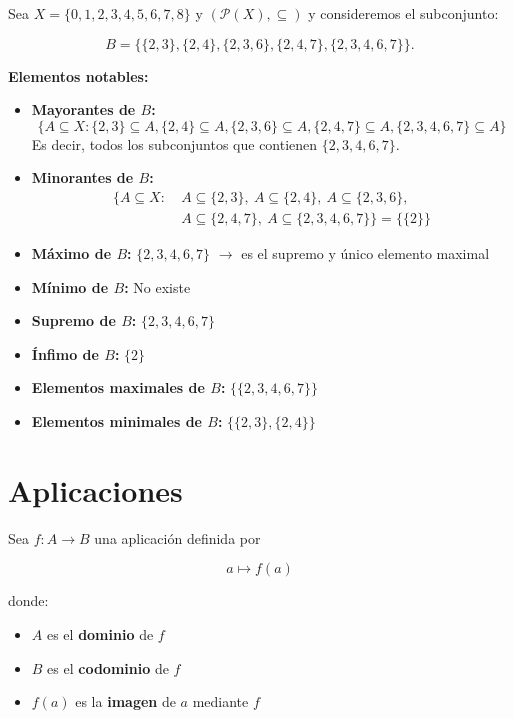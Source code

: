 \documentclass[a4paper,12pt]{article}
\begin{document}
\begin{ejemplo}[title=Ejemplo 3: Orden por Inclusión]
Sea \(X = \{0,1,2,3,4,5,6,7,8\}\) y \((\mathcal{P}(X), \subseteq)\) y consideremos el subconjunto:

\[
B = \{ \{2,3\}, \{2,4\}, \{2,3,6\}, \{2,4,7\}, \{2,3,4,6,7\} \}.
\]

\textbf{Elementos notables:}
\begin{itemize}
    \item \textbf{Mayorantes de \(B\):} 
    \[
    \{ A \subseteq X : \{2,3\} \subseteq A, \{2,4\} \subseteq A, \{2,3,6\} \subseteq A, \{2,4,7\} \subseteq A, \{2,3,4,6,7\} \subseteq A \}
    \]
    Es decir, todos los subconjuntos que contienen \(\{2,3,4,6,7\}\).
    

    
    \item \textbf{Minorantes de \(B\):} 
    \[
\begin{aligned}
\{ A \subseteq X :\ & A \subseteq \{2,3\},\ A \subseteq \{2,4\},\ A \subseteq \{2,3,6\}, \\
& A \subseteq \{2,4,7\},\ A \subseteq \{2,3,4,6,7\} \} 
= \{\{2\}\}
\end{aligned}
\]
    
    \item \textbf{Máximo de \(B\):} \(\{2,3,4,6,7\}\) \(\rightarrow\) es el supremo y único elemento maximal
    
    \item \textbf{Mínimo de \(B\):} No existe
    
    \item \textbf{Supremo de \(B\):} \(\{2,3,4,6,7\}\)
    
    \item \textbf{Ínfimo de \(B\):} \(\{2\}\)
    
    \item \textbf{Elementos maximales de \(B\):} \(\{\{2,3,4,6,7\}\}\)
    
    \item \textbf{Elementos minimales de \(B\):} \(\{\{2,3\}, \{2,4\}\}\)
\end{itemize}
\end{ejemplo}

\section{Aplicaciones}

\begin{procedimiento}[title=Definición de Aplicación]
Sea \(f : A \to B\) una aplicación definida por

\[
a \mapsto f(a)
\]

donde:
\begin{itemize}
    \item \(A\) es el \textbf{dominio} de \(f\)
    \item \(B\) es el \textbf{codominio} de \(f\)
    \item \(f(a)\) es la \textbf{imagen} de \(a\) mediante \(f\)
\end{itemize}
\end{procedimiento}
\end{document}
